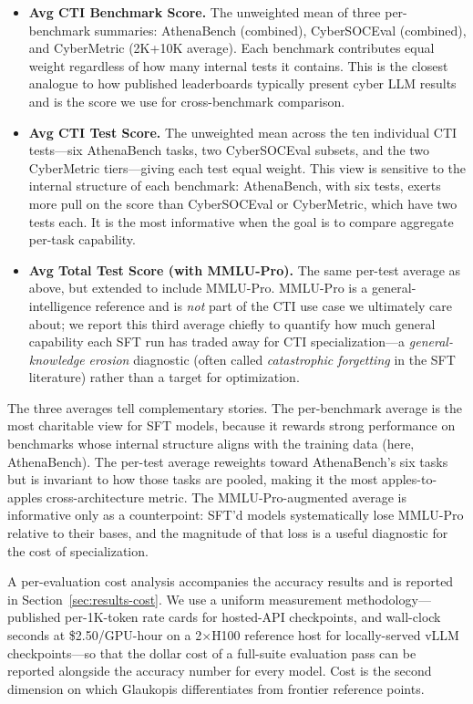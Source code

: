 \documentclass[webpdf,contemporary,large]{oup-authoring-template}
\theoremstyle{thmstyleone}
\theoremstyle{thmstyletwo}
\theoremstyle{thmstylethree}
\begin{document}
\begin{itemize}
  \item \textbf{Avg CTI Benchmark Score.} The unweighted mean of three per-benchmark summaries: AthenaBench (combined), CyberSOCEval (combined), and CyberMetric (2K+10K average). Each benchmark contributes equal weight regardless of how many internal tests it contains. This is the closest analogue to how published leaderboards typically present cyber LLM results and is the score we use for cross-benchmark comparison.
  \item \textbf{Avg CTI Test Score.} The unweighted mean across the ten individual CTI tests---six AthenaBench tasks, two CyberSOCEval subsets, and the two CyberMetric tiers---giving each test equal weight. This view is sensitive to the internal structure of each benchmark: AthenaBench, with six tests, exerts more pull on the score than CyberSOCEval or CyberMetric, which have two tests each. It is the most informative when the goal is to compare aggregate per-task capability.
  \item \textbf{Avg Total Test Score (with MMLU-Pro).} The same per-test average as above, but extended to include MMLU-Pro. MMLU-Pro is a general-intelligence reference and is \emph{not} part of the CTI use case we ultimately care about; we report this third average chiefly to quantify how much general capability each SFT run has traded away for CTI specialization---a \textit{general-knowledge erosion} diagnostic (often called \textit{catastrophic forgetting} in the SFT literature) rather than a target for optimization.
\end{itemize}

The three averages tell complementary stories. The per-benchmark average is the most charitable view for SFT models, because it rewards strong performance on benchmarks whose internal structure aligns with the training data (here, AthenaBench). The per-test average reweights toward AthenaBench's six tasks but is invariant to how those tasks are pooled, making it the most apples-to-apples cross-architecture metric. The MMLU-Pro-augmented average is informative only as a counterpoint: SFT'd models systematically lose MMLU-Pro relative to their bases, and the magnitude of that loss is a useful diagnostic for the cost of specialization.

A per-evaluation cost analysis accompanies the accuracy results and is reported in Section~\ref{sec:results-cost}. We use a uniform measurement methodology---published per-1K-token rate cards for hosted-API checkpoints, and wall-clock seconds at \$2.50/GPU-hour on a 2$\times$H100 reference host for locally-served vLLM checkpoints---so that the dollar cost of a full-suite evaluation pass can be reported alongside the accuracy number for every model. Cost is the second dimension on which Glaukopis differentiates from frontier reference points.
\end{document}
